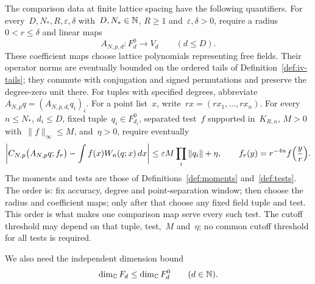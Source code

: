 \begin{definition}\label{def:mx-comparison}
The comparison data at finite lattice spacing have the following quantifiers.
For every~$D,N_*,R,\varepsilon,\delta$ with~$D,N_*\in\mathbb N$, $R\ge1$ and~$\varepsilon,\delta>0$, require a radius~$0<r\le\delta$ and linear maps
\begin{equation}\label{eq:mx-lifts}
 A_{N,p,d}:F_d^0\longrightarrow V_d\qquad(d\le D).
\end{equation}
These coefficient maps choose lattice polynomials representing free fields.
Their operator norms are eventually bounded on the ordered tails of Definition~\ref{def:iv-tails}; they commute with conjugation and signed permutations and preserve the degree-zero unit there.
For tuples with specified degrees, abbreviate~$A_{N,p}q=(A_{N,p,d_i}q_i)_i$.
For a point list~$x$, write~$rx=(rx_1,\ldots,rx_n)$.
For every~$n\le N_*$, $d_i\le D$, fixed tuple~$q_i\in F_{d_i}^0$, separated test~$f$ supported in~$K_{R,n}$, $M>0$ with~$\|f\|_\infty\le M$, and~$\eta>0$, require eventually
\begin{equation}\label{eq:mx-cutoff-comparison}
 \left|C_{N,p}\bigl(A_{N,p}q;f_r\bigr)-\int f(x)W_n(q;x)\,dx\right|
 \le\varepsilon M\prod_i\|q_i\|+\eta,
 \qquad f_r(y)=r^{-4n}f\Bigl(\frac{y}{r}\Bigr).
\end{equation}
The moments and tests are those of Definitions~\ref{def:moments} and~\ref{def:tests}.
The order is: fix accuracy, degree and point-separation window; then choose the radius and coefficient maps; only after that choose any fixed field tuple and test. This order is what makes one comparison map serve every such test.
The cutoff threshold may depend on that tuple, test,~$M$ and~$\eta$; no common cutoff threshold for all tests is required.
\end{definition}

We also need the independent dimension bound
\begin{equation}\label{eq:mx-rank}
 \dim_\mathbb C F_d\le\dim_\mathbb C F_d^0\qquad(d\in\mathbb N).
\end{equation}


